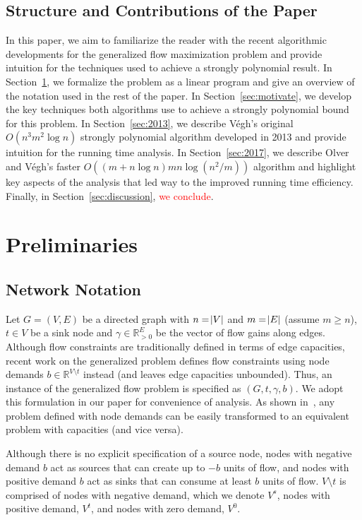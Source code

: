 \documentclass[11pt]{article}
\theoremstyle{definition}
\theoremstyle{definition}
\theoremstyle{definition}
\newcommand{\R}{\mathbb{R}}
\newcommand{\vsrc}{V^{s}}
\newcommand{\vsink}{V^{t}}
\newcommand{\vz}{V^{0}}
\newcommand{\rewrite}[1]{\textcolor{red}{#1}}
\begin{document}
	\subsection{Structure and Contributions of the Paper}\label{sec:structure}
	In this paper, we aim to
	familiarize the reader with the recent algorithmic developments for the
	generalized flow maximization problem and provide intuition for the techniques
	used to achieve a strongly polynomial result. In Section~\ref{sec:prelim}, we formalize
    the problem as a linear program and give an overview of the notation
	used in the rest of the paper. In Section~\ref{sec:motivate}, we develop the key techniques
	both algorithms use to achieve a strongly polynomial bound for this
	problem. In Section~\ref{sec:2013}, we describe Végh's original $O(n^3m^2 \log n)$ strongly
	polynomial algorithm developed in 2013 and provide intuition for the running
	time analysis. 
	In Section~\ref{sec:2017}, we describe Olver and
	Végh's faster $O((m + n\log n)mn\log(n^2 / m))$ algorithm and highlight key
	aspects of the analysis that led way to the improved running time efficiency.
	Finally, in Section~\ref{sec:discussion}, \rewrite{we conclude}.
    
\section{Preliminaries}\label{sec:prelim}

	\subsection{Network Notation}\label{sec:notation}
	Let $G=(V,E)$ be a directed graph with $n=\abs{V}$ and $m=\abs{E}$ (assume
	$m \geq n$), $t \in V$ be a sink node and $\gamma \in \R_{>0}^E$ be the vector of flow gains
	along edges. Although flow constraints are traditionally defined in terms of
	edge capacities, recent work on the generalized problem defines flow
	constraints using node demands $b \in \R^{V \setminus t}$ instead (and leaves
	edge capacities unbounded). Thus, an instance of the generalized flow problem
	is specified as $(G, t, \gamma, b)$.
	We adopt this formulation in our paper for
	convenience of analysis. As shown in~\cite{Vegh2013}, any problem defined with
	node demands can be easily transformed to an equivalent problem with
	capacities (and vice versa). 

	Although there is no explicit specification of a source node,
    nodes with negative demand $b$ act as sources that can create
	up to $-b$ units of flow, and nodes with positive demand $b$ act as sinks 
	that can consume at least $b$ units of flow. 
	$V \setminus t$ is comprised of
	nodes with negative demand, which we denote $\vsrc$, nodes with positive
	demand, $\vsink$, and nodes with zero demand, $\vz$.
\end{document}
